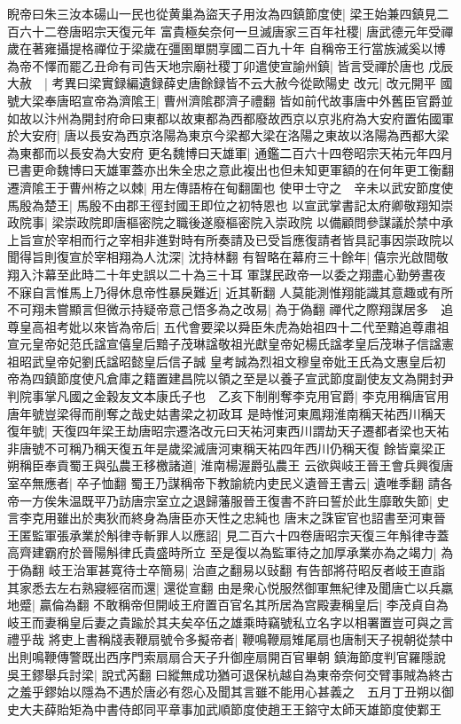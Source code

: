 睨帝曰朱三汝本碭山一民也從黄巢為盜天子用汝為四鎮節度使|{
	梁王始兼四鎮見二百六十二卷唐昭宗天復元年}
富貴極矣奈何一旦滅唐家三百年社稷|{
	唐武德元年受禪歲在著雍攝提格禪位于梁歲在彊圉單閼享國二百九十年}
自稱帝王行當族滅奚以博為帝不懌而罷乙丑命有司告天地宗廟社稷丁卯遣使宣諭州鎮|{
	皆言受禪於唐也}
戊辰大赦　|{
	考異曰梁實録編遺録薛史唐餘録皆不云大赦今從歐陽史}
改元|{
	改元開平}
國號大梁奉唐昭宣帝為濟隂王|{
	曹州濟隂郡濟子禮翻}
皆如前代故事唐中外舊臣官爵並如故以汴州為開封府命曰東都以故東都為西都廢故西京以京兆府為大安府置佑國軍於大安府|{
	唐以長安為西京洛陽為東京今梁都大梁在洛陽之東故以洛陽為西都大梁為東都而以長安為大安府}
更名魏博曰天雄軍|{
	通鑑二百六十四卷昭宗天祐元年四月已書更命魏博曰天雄軍蓋亦出朱全忠之意此複出也但未知更軍額的在何年更工衡翻}
遷濟隂王于曹州栫之以棘|{
	用左傳語栫在甸翻圍也}
使甲士守之　辛未以武安節度使馬殷為楚王|{
	馬殷不由郡王徑封國王即位之初特恩也}
以宣武掌書記太府卿敬翔知崇政院事|{
	梁崇政院即唐樞密院之職後遂廢樞密院入崇政院}
以備顧問參謀議於禁中承上旨宣於宰相而行之宰相非進對時有所奏請及已受旨應復請者皆具記事因崇政院以聞得旨則復宣於宰相翔為人沈深|{
	沈持林翻}
有智略在幕府三十餘年|{
	僖宗光啟間敬翔入汴幕至此時二十年史誤以二十為三十耳}
軍謀民政帝一以委之翔盡心勤勞晝夜不寐自言惟馬上乃得休息帝性暴戾難近|{
	近其靳翻}
人莫能測惟翔能識其意趣或有所不可翔未嘗顯言但微示持疑帝意己悟多為之改易|{
	為于偽翻}
禪代之際翔謀居多　追尊皇高祖考妣以來皆為帝后|{
	五代會要梁以舜臣朱虎為始祖四十二代至黯追尊肅祖宣元皇帝妃范氏諡宣僖皇后黯子茂琳諡敬祖光獻皇帝妃楊氏諡孝皇后茂琳子信諡憲祖昭武皇帝妃劉氏諡昭懿皇后信子誠}
皇考誠為烈祖文穆皇帝妣王氏為文惠皇后初帝為四鎮節度使凡倉庫之籍置建昌院以領之至是以養子宣武節度副使友文為開封尹判院事掌凡國之金穀友文本康氏子也　乙亥下制削奪李克用官爵|{
	李克用稱唐官用唐年號豈梁得而削奪之哉史姑書梁之初政耳}
是時惟河東鳳翔淮南稱天祐西川稱天復年號|{
	天復四年梁王劫唐昭宗遷洛改元曰天祐河東西川謂劫天子遷都者梁也天祐非唐號不可稱乃稱天復五年是歲梁滅唐河東稱天祐四年西川仍稱天復}
餘皆稟梁正朔稱臣奉貢蜀王與弘農王移檄諸道|{
	淮南楊渥爵弘農王}
云欲與岐王晉王會兵興復唐室卒無應者|{
	卒子恤翻}
蜀王乃謀稱帝下教諭統内吏民义遺晉王書云|{
	遺唯季翻}
請各帝一方俟朱温既平乃訪唐宗室立之退歸藩服晉王復書不許曰誓於此生靡敢失節|{
	史言李克用雖出於夷狄而終身為唐臣亦天性之忠純也}
唐末之誅宦官也詔書至河東晉王匿監軍張承業於斛律寺斬罪人以應詔|{
	見二百六十四卷唐昭宗天復三年斛律寺蓋高齊建霸府於晉陽斛律氏貴盛時所立}
至是復以為監軍待之加厚承業亦為之竭力|{
	為于偽翻}
岐王治軍甚寛待士卒簡易|{
	治直之翻易以䜴翻}
有告部將苻昭反者岐王直詣其家悉去左右熟寢經宿而還|{
	還從宣翻}
由是衆心悦服然御軍無紀律及聞唐亡以兵羸地蹙|{
	贏倫為翻}
不敢稱帝但開岐王府置百官名其所居為宫殿妻稱皇后|{
	李茂貞自為岐王而妻稱皇后妻之貴踰於其夫矣卒伍之雄乘時竊號私立名字以相署置豈可與之言禮乎哉}
將吏上書稱牋表鞭扇號令多擬帝者|{
	鞭鳴鞭扇雉尾扇也唐制天子視朝從禁中出則鳴鞭傳警既出西序門索扇扇合天子升御座扇開百官畢朝}
鎮海節度判官羅隱說吳王鏐舉兵討梁|{
	說式芮翻}
曰縱無成功猶可退保杭越自為東帝奈何交臂事賊為終古之羞乎鏐始以隱為不遇於唐必有怨心及聞其言雖不能用心甚義之　五月丁丑朔以御史大夫薛貽矩為中書侍郎同平章事加武順節度使趙王王鎔守太師天雄節度使鄴王

